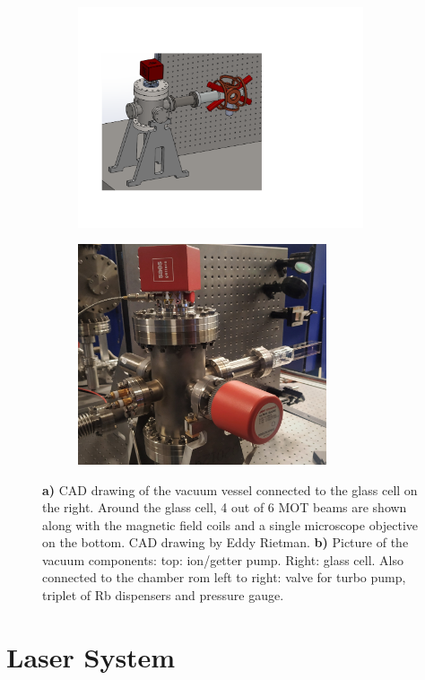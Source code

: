 \begin{figure}
	\begin{subfigure}{.5\linewidth}
		\flushleft
		\includegraphics[height=6.5cm]{figures/Vacuum.pdf}
		\caption{}
		\label{fig:VacuumSetup}
	\end{subfigure}
	\hfill
	\begin{subfigure}{.49\linewidth}
		\flushright
		\includegraphics[height=6.5cm]{figures/Chamber.jpg}
		\caption{}
		\label{fig:Chamber}
	\end{subfigure}
	\caption{\textsf{\textbf{a)}} CAD drawing of the vacuum vessel connected to the glass cell on the right. 
	Around the glass cell, 4 out of 6 MOT beams are shown along with the magnetic field coils and a single microscope objective on the bottom. 
	CAD drawing by Eddy Rietman.
    \textsf{\textbf{b)}} Picture of the vacuum components: top: ion/getter pump. Right: glass cell. Also connected to the chamber rom left to right: valve for turbo pump, triplet of Rb dispensers and pressure gauge.}
\end{figure}

\section{Laser System}\label{sec:LaserSystem}

